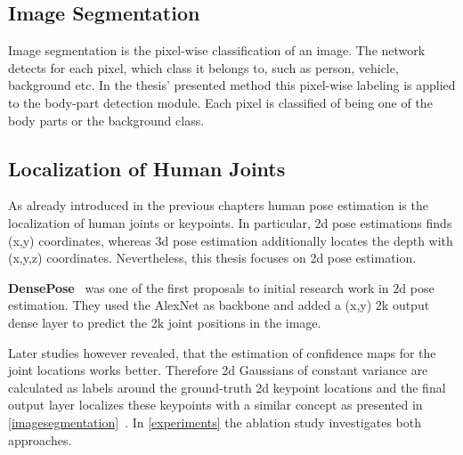 \subsection{Image Segmentation}
\label{imagesegmentation}
Image segmentation is the pixel-wise classification of an image.
The network detects for each pixel, which class it belongs to, such as person, vehicle, background etc.
In the thesis' presented method this pixel-wise labeling is applied to the body-part detection module.
Each pixel is classified of being one of the body parts or the background class.
%

\subsection{Localization of Human Joints}
As already introduced in the previous chapters human pose estimation is the localization of human joints or keypoints.
In particular, 2d pose estimations finds (x,y) coordinates, whereas 3d pose estimation additionally locates the depth with
(x,y,z) coordinates.
Nevertheless, this thesis focuses on 2d pose estimation.

\textbf{DensePose}~\cite{DensePose} was one of the first proposals to initial research work in 2d pose estimation.
They used the AlexNet as backbone and added a (x,y) 2k output dense layer to predict the 2k joint positions in the image.

Later studies however revealed, that the estimation of confidence maps for the joint locations works better.
Therefore 2d Gaussians of constant variance are calculated as labels around the ground-truth 2d keypoint locations
and the final output layer localizes these keypoints
with a similar concept as presented in \autoref{imagesegmentation}~\cite{humanpose2dguide}.
In \autoref{experiments} the ablation study investigates both approaches.





